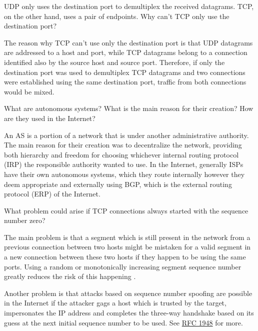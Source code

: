 \begin{Exercise}
UDP only uses the destination port to demultiplex the received datagrams.
TCP, on the other hand, uses a pair of endpoints.
Why can't TCP only use the destination port?
\end{Exercise}
\begin{Answer}
The reason why TCP can't use only the destination port is that UDP datagrams are addressed to a host and port, while TCP datagrams belong to a connection identified also by the source host and source port.
Therefore, if only the destination port was used to demultiplex TCP datagrams and two connections were established using the same destination port, traffic from both connections would be mixed.
\end{Answer}

\begin{Exercise}
What are autonomous systems?
What is the main reason for their creation?
How are they used in the Internet?
\end{Exercise}
\begin{Answer}
An AS is a portion of a network that is under another administrative authority.
The main reason for their creation was to decentralize the network, providing both hierarchy and freedom for choosing whichever internal routing protocol (IRP) the responsible authority wanted to use.
In the Internet, generally ISPs have their own autonomous systems, which they route internally however they deem appropriate and externally using BGP, which is the external routing protocol (ERP) of the Internet.
\end{Answer}

\begin{Exercise}
What problem could arise if TCP connections always started with the sequence number zero?
\end{Exercise}
\begin{Answer}
The main problem is that a segment which is still present in the network from a previous connection between two hosts might be mistaken for a valid segment in a new connection between these two hosts if they happen to be using the same ports.
Using a random or monotonically increasing segment sequence number greatly reduces the risk of this happening \cite[p.~236]{computer-networking-kurose-2012}.

Another problem is that attacks based on sequence number spoofing are possible in the Internet if the attacker gags a host which is trusted by the target, impersonates the IP address and completes the three-way handshake based on its guess at the next initial sequence number to be used. See \href{https://tools.ietf.org/html/rfc1948}{RFC 1948} for more.
\end{Answer}

